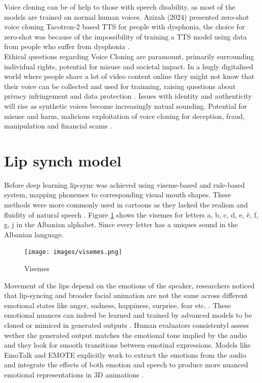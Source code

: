 \documentclass[12pt]{article}
\begin{document}
Voice cloning can be of help to those with speech disability, as most of the models are trained on normal human voices. Azizah (2024) presented zero-shot voice cloning Tacotron-2 based TTS for people with dysphonia, the choice for zero-shot was because of the impossibility of training a TTS model using data from people who suffer from dysphonia \cite{zero-shot-voice-cloning}.\\
Ethical questions regarding Voice Cloning are paramount, primarily surrounding individual rights, potential for misuse and societal impact. In a hugly digitalised world where people share a lot of video content online they might not know that their voice can be collected and used for trainning, raising questions about privacy infringement and data protection \cite{harminizaion-of-voice-cloning}. Issues with identity and authenticity will rise as synthetic voices become increasingly natual sounding. Potential for misuse and harm, malicious exploitation of voice cloning for deception, fraud, manipulation and financial scams \cite{threats-of-voice-cloning}. 


\section{Lip synch model}
Before deep learning lip-sync was achieved using viseme-based and rule-based system, mapping phonemes to corresponding visual mouth shapes. These methods were more commonly used in cartoons as they lacked the realism and fluidity of natural speech \cite{automatic-lip-synch-methods-in-games}\cite{https://doi.org/10.1002/vis.4340020404}\cite{computers14010007}. Figure \ref{img:viseme} shows the visemes for letters a, b, c, d, e, ë, f, g, j in the Albanian alphabet. Since every letter has a uniques sound in the Albanian language. 
\begin{figure}[h!]
    \centering
    \texttt{[image: images/visemes.png]}
    \caption{Visemes}
    \label{img:viseme}
\end{figure}
Movement of the lips depend on the emotions of the speaker, researchers noticed that lip-syncing and broader facial animation are not the same across different emotional states like anger, sadness, happiness, surprise, fear etc. \cite{audio-driven-facial-animation}. These emotional nuances can indeed be learned and trained by advanced models to be cloned or mimiced in generated outputs \cite{multilingual-lip-sync} \cite{mimitalk}. Human evaluators consistentyl assess wether the generated output matches the emotional tone implied by the audio and they look for smooth transitions between emotinal expressions. Models like EmoTalk and EMOTE explicitly work to extract the emotions from the audio and integrate the effects of both emotion and speech to produce more nuanced emotional representations in 3D animations \cite{audio-driven-facial-animation}. 
\end{document}

